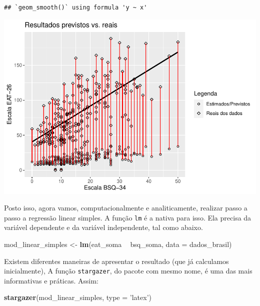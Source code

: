 \documentclass[
]{book}
\newenvironment{Shaded}{\begin{snugshade}}{\end{snugshade}}
\newcommand{\DataTypeTok}[1]{\textcolor[rgb]{0.13,0.29,0.53}{#1}}
\newcommand{\KeywordTok}[1]{\textcolor[rgb]{0.13,0.29,0.53}{\textbf{#1}}}
\newcommand{\NormalTok}[1]{#1}
\newcommand{\OperatorTok}[1]{\textcolor[rgb]{0.81,0.36,0.00}{\textbf{#1}}}
\newcommand{\StringTok}[1]{\textcolor[rgb]{0.31,0.60,0.02}{#1}}
\begin{document}
\begin{verbatim}
## `geom_smooth()` using formula 'y ~ x'
\end{verbatim}

\begin{center}\includegraphics{gitbook-demo_files/figure-latex/unnamed-chunk-84-1} \end{center}

Posto isso, agora vamos, computacionalmente e analiticamente, realizar passo a passo a regressão linear simples. A função \texttt{lm} é a nativa para isso. Ela precisa da variável dependente e da variável independente, tal como abaixo.

\begin{Shaded}
\begin{Highlighting}[]
\NormalTok{mod_linear_simples <-}\StringTok{ }\KeywordTok{lm}\NormalTok{(eat_soma }\OperatorTok{~}\StringTok{ }\NormalTok{bsq_soma, }\DataTypeTok{data =}\NormalTok{ dados_brasil)}
\end{Highlighting}
\end{Shaded}

Existem diferentes maneiras de apresentar o resultado (que já calculamos inicialmente), A função \texttt{stargazer}, do pacote com mesmo nome, é uma das mais informativas e práticas. Assim:

\begin{Shaded}
\begin{Highlighting}[]
\KeywordTok{stargazer}\NormalTok{(mod_linear_simples, }\DataTypeTok{type =} \StringTok{'latex'}\NormalTok{) }
\end{Highlighting}
\end{Shaded}
\end{document}
